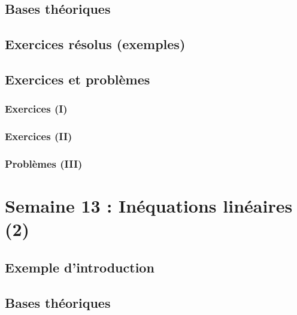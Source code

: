 \documentclass[
  12pt,
]{book}
\begin{document}
\hypertarget{bases-thuxe9oriques-11}{%
\section{Bases théoriques}\label{bases-thuxe9oriques-11}}

\hypertarget{exercices-ruxe9solus-exemples-11}{%
\section{Exercices résolus (exemples)}\label{exercices-ruxe9solus-exemples-11}}

\hypertarget{exercices-et-probluxe8mes-11}{%
\section{Exercices et problèmes}\label{exercices-et-probluxe8mes-11}}

\hypertarget{exercices-i-11}{%
\subsection{Exercices (I)}\label{exercices-i-11}}

\hypertarget{exercices-ii-11}{%
\subsection{Exercices (II)}\label{exercices-ii-11}}

\hypertarget{probluxe8mes-iii-11}{%
\subsection{Problèmes (III)}\label{probluxe8mes-iii-11}}

\hypertarget{semaine-13-inuxe9quations-linuxe9aires-2}{%
\chapter{Semaine 13 : Inéquations linéaires (2)}\label{semaine-13-inuxe9quations-linuxe9aires-2}}

\hypertarget{exemple-dintroduction-12}{%
\section{Exemple d'introduction}\label{exemple-dintroduction-12}}

\hypertarget{bases-thuxe9oriques-12}{%
\section{Bases théoriques}\label{bases-thuxe9oriques-12}}
\end{document}
